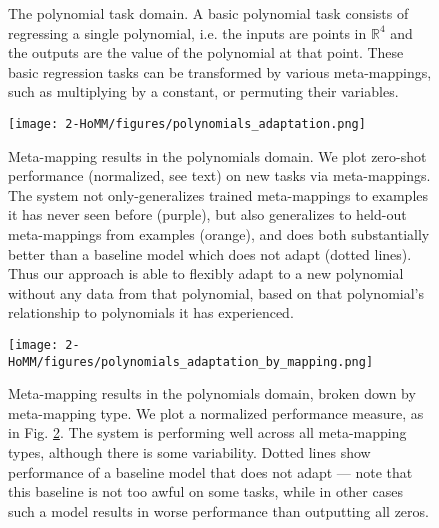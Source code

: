 \begin{figure}[htbp]
\caption[The polynomial task domain.]{The polynomial task domain. A basic polynomial task consists of regressing a single polynomial, i.e. the inputs are points in \(\mathbb{R}^4\) and the outputs are the value of the polynomial at that point. These basic regression tasks can be transformed by various meta-mappings, such as multiplying by a constant, or permuting their variables. }\label{fig:HoMM_polynomials:tasks}
\end{figure}

\begin{figure}[htbp]
\centering
\texttt{[image: 2-HoMM/figures/polynomials\_adaptation.png]}
\caption[Meta-mapping results in the polynomials domain.]{Meta-mapping results in the polynomials domain. We plot zero-shot performance (normalized, see text) on new tasks via meta-mappings. The system not only-generalizes trained meta-mappings to examples it has never seen before (purple), but also generalizes to held-out meta-mappings from examples (orange), and does both substantially better than a baseline model which does not adapt (dotted lines). Thus our approach is able to flexibly adapt to a new polynomial without any data from that polynomial, based on that polynomial's relationship to polynomials it has experienced.}\label{fig:HoMM_polynomials:results}
\end{figure}

\begin{figure}[htbp]
\centering
\texttt{[image: 2-HoMM/figures/polynomials\_adaptation\_by\_mapping.png]}
\caption[Meta-mapping results in the polynomial domain, broken down by meta-mapping type.]{Meta-mapping results in the polynomials domain, broken down by meta-mapping type. We plot a normalized performance measure, as in Fig. \ref{fig:HoMM_polynomials:results}. The system is performing well across all meta-mapping types, although there is some variability. Dotted lines show performance of a baseline model that does not adapt --- note that this baseline is not too awful on some tasks, while in other cases such a model results in worse performance than outputting all zeros.} \label{fig:HoMM_polynomials:results_by_mapping}
\end{figure}

